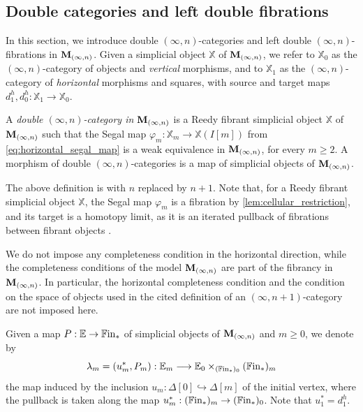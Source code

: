 \documentclass[10pt,reqno]{amsart}
\begin{document}
\subsection{Double categories and left double fibrations}
\label{subsec:internal_horizontal_segal}

In this section, we introduce double $(\infty,n)$-categories and
left double $(\infty,n)$-fibrations in $\mathbf M_{(\infty,n)}$. Given a simplicial
object $\mathbb X$ of $\mathbf M_{(\infty,n)}$, we refer to $\mathbb X_0$ as the
$(\infty,n)$-category of objects and \emph{vertical} morphisms, and
to $\mathbb X_1$ as the $(\infty,n)$-category of \emph{horizontal}
morphisms and squares, with source and target maps
$d_1^h,d_0^h:\mathbb X_1\to\mathbb X_0$.

\begin{definition}
\label{def:horizontal_segal_object}
A \emph{double $(\infty,n)$-category in $\mathbf M_{(\infty,n)}$} is a Reedy
fibrant simplicial object $\mathbb X$ of $\mathbf M_{(\infty,n)}$ such that the
Segal map $\varphi_m:\mathbb X_m\to\mathbb X(I[m])$ from
\eqref{eq:horizontal_segal_map} is a weak equivalence in $\mathbf M_{(\infty,n)}$,
for every $m\geq2$. A morphism of double $(\infty,n)$-categories
is a map of simplicial objects of $\mathbf M_{(\infty,n)}$.
\end{definition}

The above definition is \cite[Definition~1.1.3]{Moser2026InftyN} with
$n$ replaced by $n+1$. Note that, for a Reedy fibrant simplicial
object $\mathbb X$, the Segal map $\varphi_m$ is a fibration by
\cref{lem:cellular_restriction}, and its target is a homotopy limit,
as it is an iterated pullback of fibrations between fibrant objects
\cite[Theorems~15.10.8\textup{(1)} and~19.9.1\textup{(2)}]{hirschhorn2003model}.

\begin{rmk}
\label{rem:horizontal_completeness}
We do not impose any completeness condition in the horizontal
direction, while the completeness conditions of the model $\mathbf M_{(\infty,n)}$
are part of the fibrancy in $\mathbf M_{(\infty,n)}$. In particular, the horizontal
completeness condition and the condition on the space of objects used
in the cited definition of an $(\infty,n+1)$-category are not
imposed here.
\end{rmk}

Given a map $P:\mathbb E\to\mathbb{F}\mathrm{in}_*$ of simplicial objects of
$\mathbf M_{(\infty,n)}$ and $m\geq0$, we denote by
\[
\lambda_m=(u_m^*,P_m):\mathbb E_m\longrightarrow
\mathbb E_0\times_{(\mathbb{F}\mathrm{in}_*)_0}(\mathbb{F}\mathrm{in}_*)_m
\]
the map induced by the inclusion
$u_m:\Delta[0]\hookrightarrow\Delta[m]$ of the initial vertex, where
the pullback is taken along the map
$u_m^*:(\mathbb{F}\mathrm{in}_*)_m\to(\mathbb{F}\mathrm{in}_*)_0$. Note that $u_1^*=d_1^h$.
\end{document}
